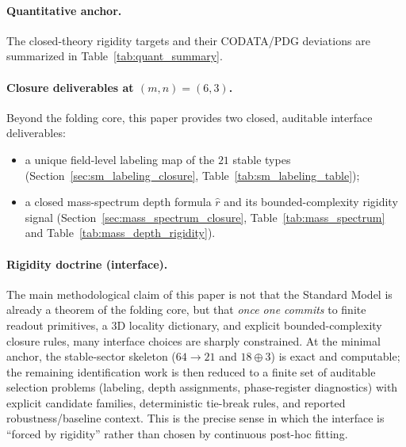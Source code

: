 \paragraph{Quantitative anchor.}
The closed-theory rigidity targets and their CODATA/PDG deviations are summarized in Table~\ref{tab:quant_summary}.

\paragraph{Closure deliverables at $(m,n)=(6,3)$.}
Beyond the folding core, this paper provides two closed, auditable interface deliverables:
\begin{itemize}
\item a unique field-level labeling map of the $21$ stable types (Section~\ref{sec:sm_labeling_closure}, Table~\ref{tab:sm_labeling_table});
\item a closed mass-spectrum depth formula $\widehat r$ and its bounded-complexity rigidity signal (Section~\ref{sec:mass_spectrum_closure}, Table~\ref{tab:mass_spectrum} and Table~\ref{tab:mass_depth_rigidity}).
\end{itemize}

\paragraph{Rigidity doctrine (interface).}
The main methodological claim of this paper is not that the Standard Model is already a theorem of the folding core, but that \emph{once one commits} to finite readout primitives, a $3$D locality dictionary, and explicit bounded-complexity closure rules, many interface choices are sharply constrained.
At the minimal anchor, the stable-sector skeleton ($64\to 21$ and $18\oplus 3$) is exact and computable; the remaining identification work is then reduced to a finite set of auditable selection problems (labeling, depth assignments, phase-register diagnostics) with explicit candidate families, deterministic tie-break rules, and reported robustness/baseline context.
This is the precise sense in which the interface is ``forced by rigidity'' rather than chosen by continuous post-hoc fitting.

